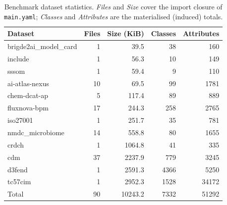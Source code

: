 \begin{table}[t]
  \centering
  \caption{Benchmark dataset statistics. \emph{Files} and \emph{Size} cover the import closure of \texttt{main.yaml}; \emph{Classes} and \emph{Attributes} are the materialised (induced) totals.}
  \label{tab:datasets}
  \begin{tabular}{lrrrr}
    \toprule
    Dataset & Files & Size (KiB) & Classes & Attributes \\
    \midrule
    brigde2ai\_model\_card & 1 & 39.5 & 38 & 160 \\
    include & 1 & 56.3 & 10 & 149 \\
    sssom & 1 & 59.4 & 9 & 110 \\
    ai-atlas-nexus & 10 & 69.5 & 99 & 1781 \\
    chem-dcat-ap & 5 & 117.4 & 89 & 889 \\
    fluxnova-bpm & 17 & 244.3 & 258 & 2765 \\
    iso27001 & 1 & 251.7 & 35 & 781 \\
    nmdc\_microbiome & 14 & 558.8 & 80 & 1655 \\
    crdch & 1 & 1064.8 & 41 & 335 \\
    cdm & 37 & 2237.9 & 779 & 3245 \\
    d3fend & 1 & 2591.3 & 4366 & 5250 \\
    tc57cim & 1 & 2952.3 & 1528 & 34172 \\
    \midrule
    Total & 90 & 10243.2 & 7332 & 51292 \\
    \bottomrule
  \end{tabular}
\end{table}
